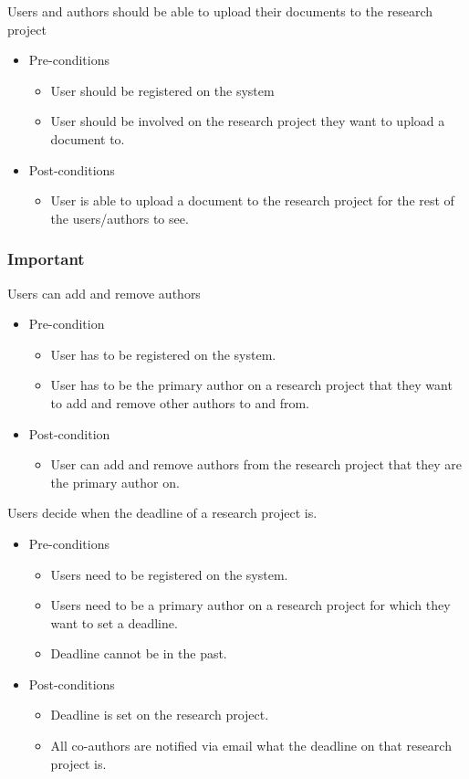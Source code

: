 \documentclass[a4paper,12pt]{report}
\begin{document}
	Users and authors should be able to upload their documents to the research project
	\begin{itemize}
		\item Pre-conditions
			\begin{itemize}
				\item User should be registered on the system
				\item User should be involved on the research project they want to upload a document to.
			\end{itemize}
		\item Post-conditions
			\begin{itemize}
				\item User is able to upload a document to the research project for the rest of the users/authors to see.
			\end{itemize}
	\end{itemize}

\subsubsection{Important}
	Users can add and remove authors
	\begin{itemize}
		\item Pre-condition
			\begin{itemize}
				\item User has to be registered on the system.
				\item User has to be the primary author on a research project that they want to add and remove other authors to and from.
			\end{itemize}
		\item Post-condition
			\begin{itemize}
				\item User can add and remove authors from the research project that they are the primary author on.
			\end{itemize}
	\end{itemize}

	Users decide when the deadline of a research project is.
	\begin{itemize}
		\item Pre-conditions
			\begin{itemize}
				\item Users need to be registered on the system.
				\item Users need to be a primary author on a research project for which they want to set a deadline.
				\item Deadline cannot be in the past.
			\end{itemize}
		\item Post-conditions
			\begin{itemize}
				\item Deadline is set on the research project.
				\item All co-authors are notified via email what the deadline on that research project is.
			\end{itemize}
	\end{itemize}
\end{document}
